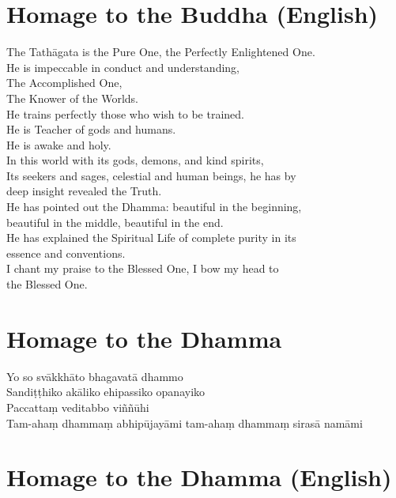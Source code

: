 \section*{Homage to the Buddha (English)}

\begin{leader}
\end{leader}

The Tathāgata is the Pure One, the Perfectly Enlightened One.\\
He is impeccable in conduct and understanding,\\
The Accomplished One,\\
The Knower of the Worlds.\\
He trains perfectly those who wish to be trained.\\
He is Teacher of gods and humans.\\
He is awake and holy.\\
In this world with its gods, demons, and kind spirits,\\
Its seekers and sages, celestial and human beings, he has by \\deep insight revealed the Truth.\\
He has pointed out the Dhamma: beautiful in the beginning, \\beautiful in the middle, beautiful in the end.\\
He has explained the Spiritual Life of complete purity in its \\essence and conventions.\\
I chant my praise to the Blessed One, I bow my head to \\the Blessed One.

\section*{Homage to the Dhamma}

\begin{leader}
\end{leader}

Yo so svākkhāto bhagavatā dhammo\\
Sandiṭṭhiko akāliko ehipassiko opanayiko\\
Paccattaṃ veditabbo viññūhi\\
Tam-ahaṃ dhammaṃ abhipūjayāmi tam-ahaṃ dhammaṃ sirasā namāmi

\section*{Homage to the Dhamma (English)}

